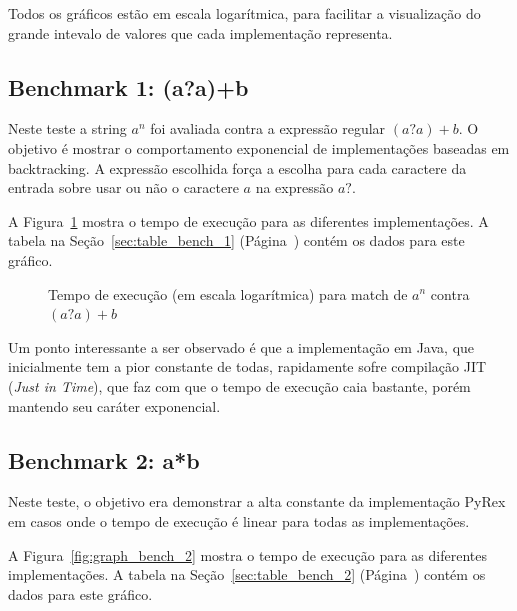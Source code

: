 \documentclass[a4paper,12pt,oneside,onecolumn]{uerj}
\begin{document}
Todos os gráficos estão em escala logarítmica, para facilitar a visualização do grande intevalo de valores que cada implementação representa.

\subsection{Benchmark 1: (a?a)+b}

Neste teste a string $a^n$ foi avaliada contra a expressão regular $(a?a)+b$. O objetivo é mostrar o comportamento exponencial de implementações baseadas em backtracking. A expressão escolhida força a escolha para cada caractere da entrada sobre usar ou não o caractere $a$ na expressão $a?$. 

A Figura~\ref{fig:graph_bench_1} mostra o tempo de execução para as diferentes implementações. A tabela na Seção~\ref{sec:table_bench_1} (Página~\pageref{sec:table_bench_1}) contém os dados para este gráfico.

\begin{figure}[!htbp]
\centering
{}
\caption{Tempo de execução (em escala logarítmica) para match de $a^n$ contra $(a?a)+b$}
\label{fig:graph_bench_1}
\end{figure}

Um ponto interessante a ser observado é que a implementação em Java, que inicialmente tem a pior constante de todas, rapidamente sofre compilação JIT (\emph{Just in Time}), que faz com que o tempo de execução caia bastante, porém mantendo seu caráter exponencial.

\subsection{Benchmark 2: a*b}

Neste teste, o objetivo era demonstrar a alta constante da implementação PyRex em casos onde o tempo de execução é linear para todas as implementações.

A Figura~\ref{fig:graph_bench_2} mostra o tempo de execução para as diferentes implementações. A tabela na Seção~\ref{sec:table_bench_2} (Página~\pageref{sec:table_bench_2}) contém os dados para este gráfico.
\end{document}
